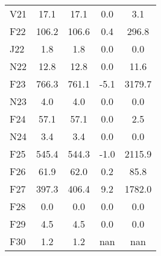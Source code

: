 \documentclass[article,crop=false]{standalone}%
\begin{document}
\begin{tabular}[h]{l | c c c c}
V21&17.1&17.1&0.0&3.1\\%
\rowcolor{white}%
F22&106.2&106.6&0.4&296.8\\%
\rowcolor{lightgray}%
J22&1.8&1.8&0.0&0.0\\%
\rowcolor{white}%
N22&12.8&12.8&0.0&11.6\\%
\rowcolor{lightgray}%
F23&766.3&761.1&{-}5.1&3179.7\\%
\rowcolor{white}%
N23&4.0&4.0&0.0&0.0\\%
\rowcolor{lightgray}%
F24&57.1&57.1&0.0&2.5\\%
\rowcolor{white}%
N24&3.4&3.4&0.0&0.0\\%
\rowcolor{lightgray}%
F25&545.4&544.3&{-}1.0&2115.9\\%
\rowcolor{white}%
F26&61.9&62.0&0.2&85.8\\%
\rowcolor{lightgray}%
F27&397.3&406.4&9.2&1782.0\\%
\rowcolor{white}%
F28&0.0&0.0&0.0&0.0\\%
\rowcolor{lightgray}%
F29&4.5&4.5&0.0&0.0\\%
\rowcolor{white}%
F30&1.2&1.2&nan&nan\\%
\hline%
\end{tabular}%
\end{document}
